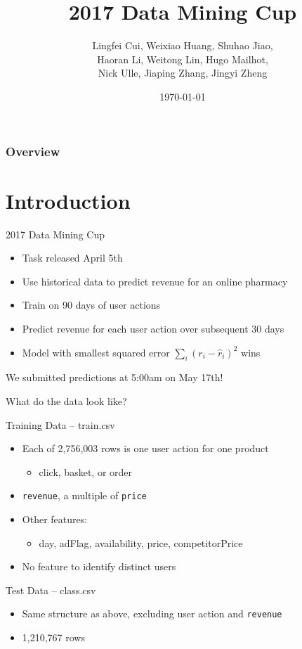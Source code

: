 \documentclass{beamer}
\title{2017 Data Mining Cup}
\author[2017 Team]{
  Lingfei Cui, \textcolor{lgray}{Weixiao Huang}, Shuhao Jiao,\\
  Haoran Li,   \textcolor{lgray}{Weitong Lin},   \textcolor{lgray}{Hugo Mailhot},\\
  Nick Ulle,   \textcolor{lgray}{Jiaping Zhang}, Jingyi Zheng
}
\institute[UC Davis]{University of California, Davis}
\date{\today}
\begin{document}
\begin{frame}
  \titlepage
\end{frame}

\begin{frame}
  \frametitle{Overview} %
  \tableofcontents
\end{frame}


\section{Introduction} %

\begin{frame}{2017 Data Mining Cup}
    \begin{itemize}
      \item Task released April 5th
      \item Use historical data to predict revenue for an online pharmacy
      \item Train on 90 days of user actions
      \item Predict revenue for each user action over subsequent 30 days
      \item Model with smallest squared error $\sum_i (r_i - \hat{r}_i)^2$ wins
    \end{itemize}
  We submitted predictions at 5:00am on May 17th!
\end{frame}

\begin{frame}{What do the data look like?}
  \begin{block}{Training Data -- train.csv} 
    \begin{itemize}
      \item Each of 2,756,003 rows is one user action for one product
        \begin{itemize}
          \item click, basket, or order
        \end{itemize}
      \item \texttt{revenue}, a multiple of \texttt{price}
      \item Other features:
        \begin{itemize}
          \item day, adFlag, availability, price, competitorPrice
        \end{itemize}
      \item No feature to identify distinct users
    \end{itemize}
  \end{block}

  \begin{block}{Test Data -- class.csv} 
    \begin{itemize}
      \item Same structure as above, excluding user action and \texttt{revenue}
      \item 1,210,767 rows
    \end{itemize}
  \end{block}
\end{frame}
\end{document}
